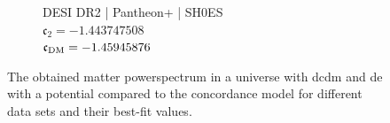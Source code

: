 \begin{figure}[htbp]
	\hspace*{\fill}
	\begin{subfigure}[t]{0.49\textwidth}
		\centering
		\resizebox{\linewidth}{!}{%
		}
		\caption{DESI DR2 | Pantheon+ | SH0ES\\$\mathfrak{c}_2 = -1.443747508$\\$\mathfrak{c}_{\textnormal{DM}} = -1.45945876$}
		\label{fig:HyperbolicPk:PPSD}
	\end{subfigure}
	\hspace*{\fill}

	\tagstructend
	\caption[Matter powerspectrum.]{The obtained matter powerspectrum in a universe with \gls{dc}\gls{dm} and \gls{de} with a  potential compared to the concordance model for different data sets and their best-fit values.}
	\label{fig:HyperbolicPk}
\end{figure}
